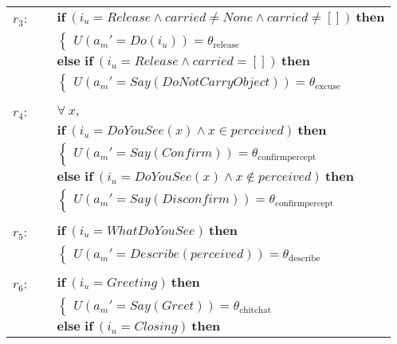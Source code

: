 \begin{footnotesize}
\begin{longtable}{p{2cm}l}
$r_{3}$: \ \ & $ \textbf{if} \ (\mathit{i_u}\!=\!\mathit{Release} \land \mathit{carried}\!\neq\!\mathit{None} \land \mathit{carried}\!\neq\!\mathit{[]}) \ \textbf{then} $ \\
 & \;\;\;\;\; $ \begin{cases}U(\mathit{a_m}'\!=\!\mathit{Do({i_u})})\!=\!\theta_{\mathrm{release}} \end{cases}$ \vspace{1mm} \\ & $ \textbf{else if} \ (\mathit{i_u}\!=\!\mathit{Release} \land \mathit{carried}\!=\!\mathit{[]}) \ \textbf{then}$ \\
& \;\;\;\;\; $ \begin{cases}U(\mathit{a_m}'\!=\!\mathit{Say(DoNotCarryObject)})\!=\!\theta_{\mathrm{excuse}} \end{cases}$ \\ \\[-1mm]
$r_{4}$: \ \ & $\forall \ x, $ \\ & $ \textbf{if} \ (\mathit{i_u}\!=\!\mathit{DoYouSee({x})} \land \mathit{{x}}\!\in\!\mathit{perceived}) \ \textbf{then} $ \\
 & \;\;\;\;\; $ \begin{cases}U(\mathit{a_m}'\!=\!\mathit{Say(Confirm)})\!=\!\theta_{\mathrm{confirmpercept}} \end{cases}$ \vspace{1mm} \\ & $ \textbf{else if} \ (\mathit{i_u}\!=\!\mathit{DoYouSee({x})} \land \mathit{{x}}\!\notin\!\mathit{perceived}) \ \textbf{then}$ \\
& \;\;\;\;\; $ \begin{cases}U(\mathit{a_m}'\!=\!\mathit{Say(Disconfirm)})\!=\!\theta_{\mathrm{confirmpercept}} \end{cases}$ \\ \\[-1mm]
$r_{5}$: \ \ & $ \textbf{if} \ (\mathit{i_u}\!=\!\mathit{WhatDoYouSee}) \ \textbf{then} $ \\
 & \;\;\;\;\; $ \begin{cases}U(\mathit{a_m}'\!=\!\mathit{Describe({perceived})})\!=\!\theta_{\mathrm{describe}} \end{cases}$ \\ \\[-1mm]
$r_{6}$: \ \ & $ \textbf{if} \ (\mathit{i_u}\!=\!\mathit{Greeting}) \ \textbf{then} $ \\
 & \;\;\;\;\; $ \begin{cases}U(\mathit{a_m}'\!=\!\mathit{Say(Greet)})\!=\!\theta_{\mathrm{chitchat}} \end{cases}$ \vspace{1mm} \\ & $ \textbf{else if} \ (\mathit{i_u}\!=\!\mathit{Closing}) \ \textbf{then}$ \\

\end{longtable}
\end{footnotesize}
